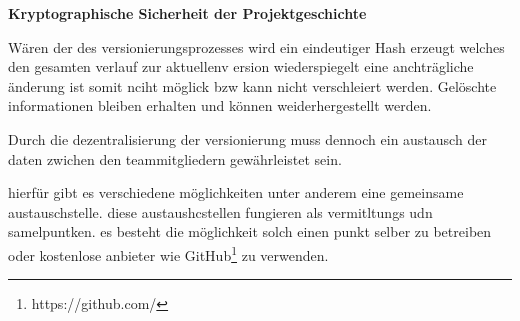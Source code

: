 \textbf{Kryptographische Sicherheit der Projektgeschichte}

Wären der des versionierungsprozesses wird ein eindeutiger Hash erzeugt welches den gesamten verlauf zur aktuellenv ersion wiederspiegelt eine anchträgliche änderung ist somit nciht möglick bzw kann nicht verschleiert werden. Gelöschte informationen bleiben erhalten und können weiderhergestellt werden.

Durch die dezentralisierung der versionierung muss dennoch ein austausch der daten zwichen den teammitgliedern gewährleistet sein.

hierfür gibt es verschiedene möglichkeiten unter anderem eine gemeinsame austauschstelle. diese austaushcstellen fungieren als vermitltungs udn samelpuntken. es besteht die möglichkeit solch einen punkt selber zu betreiben oder kostenlose anbieter wie GitHub\footnote{https://github.com/} zu verwenden.

